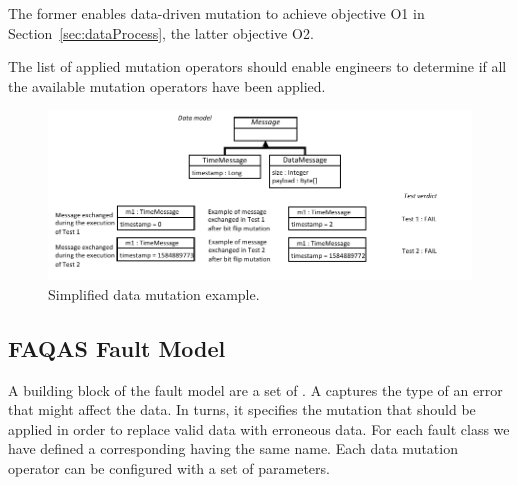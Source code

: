 The former enables data-driven mutation to achieve objective O1 in Section~\ref{sec:dataProcess}, the latter objective O2. 

The list of applied mutation operators should enable engineers to determine if all the available mutation operators have been applied.


\begin{figure}[t!]
  \centering
    \includegraphics{images/DataDrivenSimpleExample}
      \caption{Simplified data mutation example.}
      \label{fig:DataDrivenSimpleExample}
\end{figure}

\clearpage



\clearpage
\subsection{FAQAS Fault Model}
\label{sec:dataModel}
\label{sec:faultModel}





A building block of the fault model are a set of .
A   captures the type of an error that might affect the data. In turns, it specifies the mutation that should be applied in order to replace valid data with erroneous data. For each fault class we have defined a corresponding  having the same name. Each data mutation operator can be configured with a set of parameters. 

